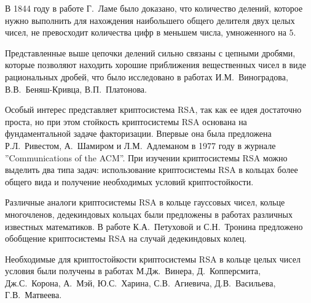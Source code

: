 \documentclass[_00_autoref.tex]{subfiles}
\begin{document}
В 1844 году в работе Г.~Ламе было доказано, что количество делений, которое нужно выполнить для нахождения наибольшего общего делителя двух целых чисел, не превосходит количества цифр в меньшем числа, умноженного на $5$.

Представленные выше цепочки делений сильно связаны с цепными дробями, которые позволяют находить хорошие приближения вещественных чисел в виде рациональных дробей, что было исследовано в работах И.М.~Виноградова,  В.В.~Беняш-Кривца, В.П.~Платонова.

Особый интерес представляет криптосистема RSA, так как ее идея достаточно проста, но при этом стойкость криптосистемы RSA основана на фундаментальной задаче факторизации.
Впервые она была предложена Р.Л.~Ривестом, А.~Шамиром и Л.М.~Адлеманом в 1977 году в журнале ''Communications of the ACM''.
При изучении криптосистемы RSA можно выделить два типа задач: использование криптосистемы RSA в кольцах более общего вида и получение необходимых условий криптостойкости.

Различные аналоги криптосистемы RSA в кольце гауссовых чисел, кольце многочленов, дедекиндовых кольцах были предложены в работах различных известных математиков.
В работе К.А.~Петуховой и С.Н.~Тронина предложено обобщение криптосистемы RSA на случай дедекиндовых колец.

Необходимые для криптостойкости криптосистемы RSA в кольце целых чисел условия были получены в работах М.Дж.~Винера, Д.~Копперсмита, Дж.С.~Корона, А.~Мэй, Ю.С.~Харина, С.В.~Агиевича, Д.В.~Васильева, Г.В.~Матвеева.
\end{document}
